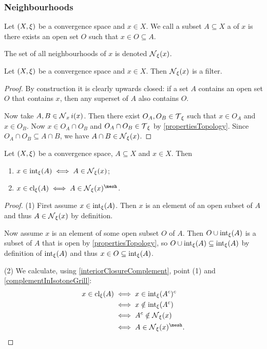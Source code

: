 \subsubsection{Neighbourhoods}
\begin{definition}
Let $\sSet{X,\xi}$ be a convergence space and $x\in X$. We call a subset $A\subseteq X$ a  of $x$ is there exists an open set $O$ such that $x\in O \subseteq A$.

The set of all neighbourhoods of $x$ is denoted $\operatorname{\mathcal{N}}_\xi(x)$.
\end{definition}
\begin{lemma}
Let $\sSet{X,\xi}$ be a convergence space and $x\in X$. Then $\operatorname{\mathcal{N}}_\xi(x)$ is a filter.
\end{lemma}
\begin{proof}
By construction it is clearly upwards closed: if a set $A$ contains an open set $O$ that contains $x$, then any superset of $A$ also contains $O$.

Now take $A,B\in \operatorname{\mathcal{N}}_xi(x)$. Then there exist $O_A, O_B \in \operatorname{\mathcal{T}}_\xi$ such that $x\in O_A$ and $x\in O_B$. Now $x\in O_A\cap O_B$ and $O_A\cap O_B \in \operatorname{\mathcal{T}}_\xi$ by \ref{propertiesTopology}. Since $O_A\cap O_B\subseteq A\cap B$, we have $A\cap B\in \operatorname{\mathcal{N}}_\xi(x)$.
\end{proof}

\begin{proposition} \label{interiorClosureMembership}
Let $\sSet{X,\xi}$ be a convergence space, $A\subseteq X$ and $x\in X$. Then
\begin{enumerate}
\item $x\in \operatorname{int}_\xi(A) \iff A \in \operatorname{\mathcal{N}}_\xi(x)$;
\item $x\in \closure_\xi(A) \iff A \in \neighbourhood_\xi(x)^{\mesh}$.
\end{enumerate}
\end{proposition}
\begin{proof}
(1) First assume $x\in \operatorname{int}_\xi(A)$. Then $x$ is an element of an open subset of $A$ and thus $A\in \operatorname{\mathcal{N}}_\xi(x)$ by definition.

Now assume $x$ is an element of some open subset $O$ of $A$. Then $O \cup \operatorname{int}_\xi(A)$ is a subset of $A$ that is open by \ref{propertiesTopology}, so $O \cup \operatorname{int}_\xi(A) \subseteq \operatorname{int}_\xi(A)$ by definition of $\operatorname{int}_\xi(A)$ and thus $x\in O\subseteq \operatorname{int}_\xi(A)$.

(2) We calculate, using \ref{interiorClosureComplement}, point (1) and \ref{complementInIsotoneGrill}:
\begin{align*}
x\in \closure_\xi(A) &\iff x\in \interior_\xi(A^c)^c \\
&\iff x\notin \interior_\xi(A^c) \\
&\iff A^c \notin \neighbourhood_\xi(x) \\
&\iff A \in \neighbourhood_\xi(x)^\mesh.
\end{align*}
\end{proof}

